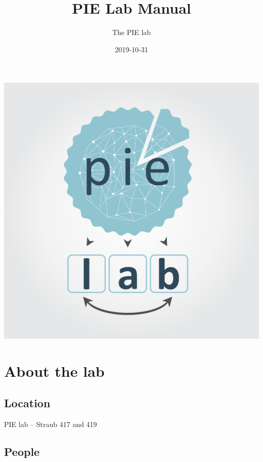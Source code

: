 \documentclass[]{book}
\title{PIE Lab Manual}
\author{The PIE lab}
\date{2019-10-31}
\begin{document}
\maketitle

{
\setcounter{tocdepth}{1}
\tableofcontents
}
\hypertarget{section}{%
\chapter*{}\label{section}}

\includegraphics{images/PIElab5.png}

\hypertarget{about-the-lab}{%
\chapter{About the lab}\label{about-the-lab}}

\hypertarget{location}{%
\section{Location}\label{location}}

PIE lab -- Straub 417 and 419

\hypertarget{people}{%
\section{People}\label{people}}
\end{document}
